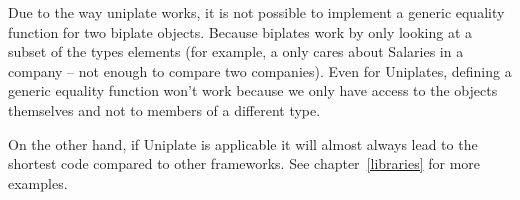 Due to the way uniplate works, it is not possible to implement a generic
equality function for two biplate objects. Because biplates work by only
looking at a subset of the types elements (for example, a 
only cares about Salaries in a company -- not enough to compare two companies). Even
for Uniplates, defining a generic equality function won't work because we
only have access to the objects themselves and not to members of a different
type.

On the other hand, if Uniplate is applicable it will almost always lead to
the shortest code compared to other frameworks. See chapter~\ref{libraries}
for more examples.

